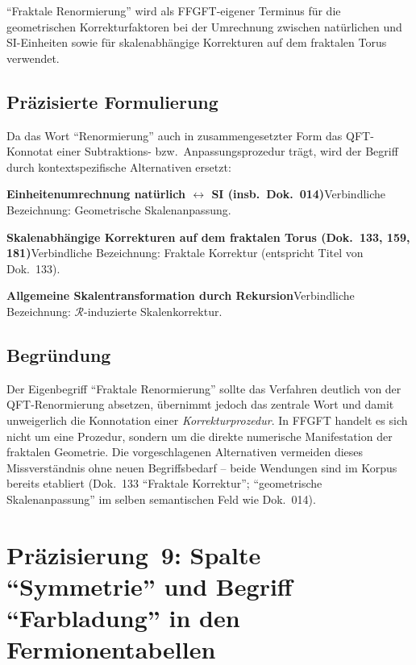 \enquote{Fraktale Renormierung} wird als FFGFT-eigener Terminus für die
geometrischen Korrekturfaktoren bei der Umrechnung zwischen
natürlichen und SI-Einheiten sowie für skalenabhängige Korrekturen
auf dem fraktalen Torus verwendet.

\subsection*{Präzisierte Formulierung}

Da das Wort \enquote{Renormierung} auch in zusammengesetzter Form
das QFT-Konnotat einer Subtraktions- bzw.\ Anpassungsprozedur trägt,
wird der Begriff durch kontextspezifische Alternativen ersetzt:

\smallskip\noindent \textbf{Einheitenumrechnung natürlich $\leftrightarrow$ SI (insb.\ Dok.~014)}\quad Verbindliche Bezeichnung: Geometrische Skalenanpassung.

\smallskip\noindent \textbf{Skalenabhängige Korrekturen auf dem fraktalen Torus (Dok.~133, 159, 181)}\quad Verbindliche Bezeichnung: Fraktale Korrektur (entspricht Titel von Dok.~133).

\smallskip\noindent \textbf{Allgemeine Skalentransformation durch Rekursion}\quad Verbindliche Bezeichnung: $\mathcal{R}$-induzierte Skalenkorrektur.

\medskip


\subsection*{Begründung}

Der Eigenbegriff \enquote{Fraktale Renormierung} sollte das Verfahren
deutlich von der QFT-Renormierung absetzen, übernimmt jedoch das
zentrale Wort und damit unweigerlich die Konnotation einer
\emph{Korrekturprozedur}. In FFGFT handelt es sich nicht um eine
Prozedur, sondern um die direkte numerische Manifestation der
fraktalen Geometrie. Die vorgeschlagenen Alternativen vermeiden
dieses Missverständnis ohne neuen Begriffsbedarf -- beide Wendungen
sind im Korpus bereits etabliert (Dok.~133 \enquote{Fraktale Korrektur};
\enquote{geometrische Skalenanpassung} im selben semantischen Feld
wie Dok.~014).

\section{\texorpdfstring{Präzisierung~9: Spalte \enquote{Symmetrie} und Begriff \enquote{Farbladung} in den Fermionentabellen}{Praezisierung 9: Spalte Symmetrie und Begriff Farbladung in den Fermionentabellen}}

